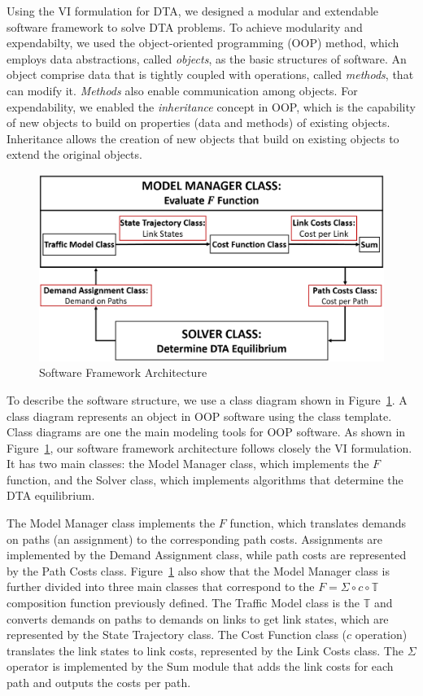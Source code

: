 Using the VI formulation for DTA, we designed a modular and extendable software framework to solve DTA problems. To achieve modularity and expendabilty, we used the object-oriented programming (OOP) method, which employs data abstractions, called \textit{objects}, as the basic structures of software. An object comprise data that is tightly coupled with operations, called \textit{methods}, that can modify it. \textit{Methods} also enable communication among objects. For expendability, we enabled the \textit{inheritance} concept in OOP, which is the capability of new objects to build on properties (data and methods) of existing objects. Inheritance allows the creation of new objects that build on existing objects to extend the original objects\cite{ten1989object}.

\begin{figure}[h]
    \centering
    \includegraphics[width=\linewidth]{Class_Diagram.PNG}
    \caption{Software Framework Architecture}
    \label{fig:class_diagram}
\end{figure}

To describe the software structure, we use a class diagram shown in  Figure~\ref{fig:class_diagram}. A class diagram represents an object in OOP software using the class template. Class diagrams are one the main modeling tools for OOP software. As shown in Figure~\ref{fig:class_diagram}, our software framework architecture follows closely the VI formulation. It has two main classes: the Model Manager class, which implements the $F$ function, and the Solver class, which implements algorithms that determine the DTA equilibrium. 

The Model Manager class implements the $F$ function, which translates demands on paths (an assignment) to the corresponding path costs. Assignments are implemented by the Demand Assignment class, while path costs are represented by the Path Costs class. Figure~\ref{fig:class_diagram} also show that the Model Manager class is further divided into three main classes that correspond to the $F = \Sigma\circ c \circ \mathbb{T}$ composition function previously defined. The Traffic Model class is the $\mathbb{T}$ and converts demands on paths to demands on links to get link states, which are represented by the State Trajectory class. The Cost Function class  ($c$ operation) translates the link states to link costs, represented by the Link Costs class. The $\Sigma$ operator is implemented by the Sum module that adds the link costs for each path and outputs the costs per path. 

